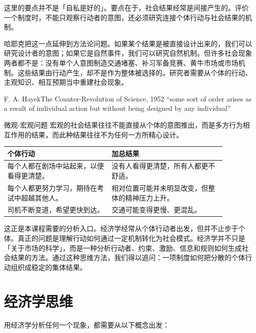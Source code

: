 \documentclass[UTF8,10pt,a4paper,scheme=chinese]{ctexart}
\begin{document}
\begin{warningbox}{}
这里的要点并不是「自私是好的」。要点在于，社会结果经常是间接产生的。评价一个制度时，不能只观察行动者的意图，还必须研究连接个体行动与社会结果的机制。
\end{warningbox}

哈耶克把这一点延伸到方法论问题。如果某个结果是被直接设计出来的，我们可以研究设计者的意图；如果它是自然事件，我们可以研究自然机制。但许多社会现象两者都不是：没有单个人意图制造交通堵塞、补习军备竞赛、黄牛市场或市场机制。这些结果由行动产生，却不是作为整体被选择的。研究者需要从个体的行动、主观知识、相互预期当中重建社会现象。

\begin{quotebox}{F. A. Hayek}{The Counter-Revolution of Science, 1952}
``some sort of order arises as a result of individual action but without being designed by any individual''
\end{quotebox}

\begin{conceptbox}{微观-宏观问题}
宏观的社会结果往往不能直接从个体的意图推出，而是多方行为相互作用的结果，而此种结果往往不为任何一方所精心设计。

\begin{center}
\small
\begin{tabular}{p{0.42\linewidth}p{0.46\linewidth}}
\hline
\textbf{个体行动} & \textbf{加总结果} \tabularnewline
\hline
每个人都在剧场中站起来，以便看得更清楚。 & 没有人看得更清楚，所有人都更不舒适。 \tabularnewline
每个人都更努力学习，期待在考试中超越其他人。 & 相对位置可能并未明显改变，但整体的精神压力上升。 \tabularnewline
司机不断变道，希望更快到达。 & 交通可能变得更慢、更混乱。 \tabularnewline
\hline
\end{tabular}
\end{center}
\end{conceptbox}

这正是本课程需要的分析入口。经济学经常从个体行动者出发，但并不止步于个体。真正的问题是理解行动如何通过一定机制转化为社会模式。经济学并不只是「关于市场的科学」，而是一种分析行动者、约束、激励、信息和规则如何生成社会结果的方法。通过这种思维方法，我们得以追问：一项制度如何把分散的个体行动组织成稳定的集体结果。

\section{经济学思维}

用经济学分析任何一个现象，都需要从以下概念出发：
\end{document}

